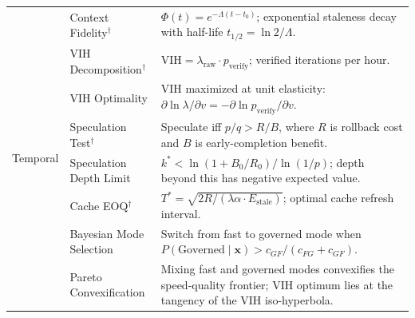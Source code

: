 \begin{appendices}
\begin{table}[H]
\begin{tabular}{p{1.8cm}p{3.8cm}p{7.5cm}}
\multirow{8}{1.8cm}{Temporal}
    & Context Fidelity$^\dagger$ & $\Phi(t) = e^{-\Lambda(t-t_0)}$; exponential staleness decay with half-life $t_{1/2} = \ln 2 / \Lambda$. \\
    & VIH Decomposition$^\dagger$ & $\text{VIH} = \lambda_{\text{raw}} \cdot p_{\text{verify}}$; verified iterations per hour. \\
    & VIH Optimality & VIH maximized at unit elasticity: $\partial \ln \lambda / \partial v = -\partial \ln p_{\text{verify}} / \partial v$. \\
    & Speculation Test$^\dagger$ & Speculate iff $p/q > R/B$, where $R$ is rollback cost and $B$ is early-completion benefit. \\
    & Speculation Depth Limit & $k^* < \ln(1 + B_0/R_0)/\ln(1/p)$; depth beyond this has negative expected value. \\
    & Cache EOQ$^\dagger$ & $T^* = \sqrt{2R/(\lambda\alpha \cdot E_{\text{stale}})}$; optimal cache refresh interval. \\
    & Bayesian Mode Selection & Switch from fast to governed mode when $P(\text{Governed} \mid \mathbf{x}) > c_{GF}/(c_{FG} + c_{GF})$. \\
    & Pareto Convexification & Mixing fast and governed modes convexifies the speed-quality frontier; VIH optimum lies at the tangency of the VIH iso-hyperbola. \\

\midrule


\end{tabular}
\end{table}
\end{appendices}

